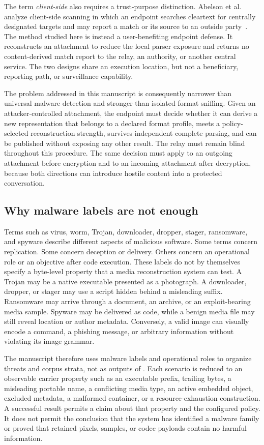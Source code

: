 The term \emph{client-side} also requires a trust-purpose distinction.
Abelson et al. analyze client-side scanning in which an endpoint searches
cleartext for centrally designated targets and may report a match or its source
to an outside party~\cite{abelson2024}. The method studied here is instead a
user-benefiting endpoint defense. It reconstructs an attachment to reduce the
local parser exposure and returns no content-derived match report to the relay,
an authority, or another central service. The two designs share an execution
location, but not a beneficiary, reporting path, or surveillance capability.

The problem addressed in this manuscript is consequently narrower than
universal malware detection and stronger than isolated format sniffing. Given
an attacker-controlled attachment, the endpoint must decide whether it can
derive a new representation that belongs to a declared format profile, meets a
policy-selected reconstruction strength, survives independent complete
parsing, and can be published without exposing any other result. The relay must
remain blind throughout this procedure. The same decision must apply to an
outgoing attachment before encryption and to an incoming attachment after
decryption, because both directions can introduce hostile content into a
protected conversation.

\subsection{Why malware labels are not enough}

Terms such as virus, worm, Trojan, downloader, dropper, stager, ransomware, and
spyware describe different aspects of malicious software. Some terms concern
replication. Some concern deception or delivery. Others concern an operational
role or an objective after code execution. These labels do not by themselves
specify a byte-level property that a media reconstruction system can test. A
Trojan may be a native executable presented as a photograph. A downloader,
dropper, or stager may use a script hidden behind a misleading suffix.
Ransomware may arrive through a document, an archive, or an exploit-bearing
media sample. Spyware may be delivered as code, while a benign media file may
still reveal location or author metadata.
Conversely, a valid image can visually encode a command, a phishing message, or
arbitrary information without violating its image grammar.

The manuscript therefore uses malware labels and operational roles to organize
threats and corpus strata, not as outputs of \AFD. Each scenario is reduced to
an observable carrier property such as an executable prefix, trailing bytes, a
misleading portable name, a conflicting media type, an active embedded object,
excluded metadata, a malformed container, or a resource-exhaustion
construction. A successful result permits a claim about that property and the
configured policy. It does not permit the conclusion that the system has
identified a malware family or proved that retained pixels, samples, or codec
payloads contain no harmful information.

